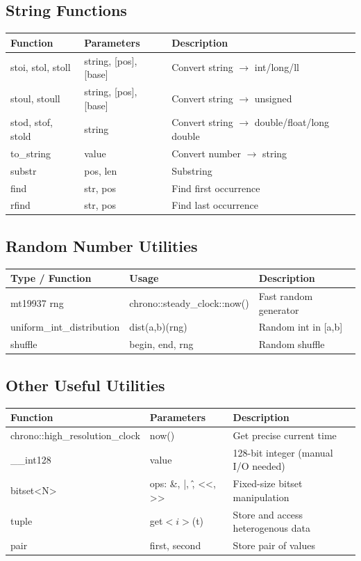 \documentclass[10pt]{article}
\begin{document}
\begin{multicols*}{2}
\subsection*{String Functions}
\begin{tabularx}{\linewidth}{|l|l|X|}
    \hline
    \textbf{Function} & \textbf{Parameters} & \textbf{Description} \\
    \hline
    stoi, stol, stoll & string, [pos], [base] & Convert string $\to$ int/long/ll \\
    \hline
    stoul, stoull & string, [pos], [base] & Convert string $\to$ unsigned \\
    \hline
    stod, stof, stold & string & Convert string $\to$ double/float/long double \\
    \hline
    to\_string & value & Convert number $\to$ string \\
    \hline
    substr & pos, len & Substring \\
    \hline
    find & str, pos & Find first occurrence \\
    \hline
    rfind & str, pos & Find last occurrence \\
    \hline
\end{tabularx}

\subsection*{Random Number Utilities}
\begin{tabularx}{\linewidth}{|l|l|X|}
    \hline
    \textbf{Type / Function} & \textbf{Usage} & \textbf{Description} \\
    \hline
    mt19937 rng & chrono::steady\_clock::now() & Fast random generator \\
    \hline
    uniform\_int\_distribution & dist(a,b)(rng) & Random int in [a,b] \\
    \hline
    shuffle & begin, end, rng & Random shuffle \\
    \hline
\end{tabularx}

\subsection*{Other Useful Utilities}
\begin{tabularx}{\linewidth}{|l|l|X|}
    \hline
    \textbf{Function} & \textbf{Parameters} & \textbf{Description} \\
    \hline
    chrono::high\_resolution\_clock & now() & Get precise current time \\
    \hline
    \_\_int128 & value & 128-bit integer (manual I/O needed) \\
    \hline
    bitset<N> & ops: \&, |, \^, <<, >> & Fixed-size bitset manipulation \\
    \hline
    tuple & get$<i>$(t) & Store and access heterogenous data \\
    \hline
    pair & first, second & Store pair of values \\
    \hline
\end{tabularx}


\end{multicols*}
\end{document}
